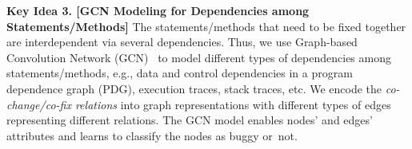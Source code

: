 \vspace{3pt}
{\bf Key Idea 3. [GCN Modeling for Dependencies among
    Statements/Methods]} The statements/methods that need to be fixed
together are interdependent via several dependencies. Thus, we use
Graph-based Convolution Network (GCN)~\cite{li2019gcn} to model
different types of dependencies among statements/methods,
e.g., data and control dependencies in a program dependence graph
(PDG), execution traces, stack traces, etc.
We encode the {\em co-change/co-fix relations}
into graph representations with different types of edges
representing different relations. The GCN model enables nodes'
and edges' attributes and learns to classify the nodes as buggy
or~not.









